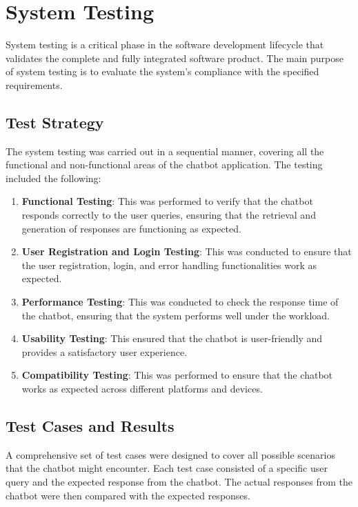 
\chapter{System Testing}

System testing is a critical phase in the software development lifecycle that validates the complete and fully integrated software product. The main purpose of system testing is to evaluate the system's compliance with the specified requirements.

\section{Test Strategy}

The system testing was carried out in a sequential manner, covering all the functional and non-functional areas of the chatbot application. The testing included the following:

\begin{enumerate}
\item \textbf{Functional Testing}: This was performed to verify that the chatbot responds correctly to the user queries, ensuring that the retrieval and generation of responses are functioning as expected.
\item \textbf{User Registration and Login Testing}: This was conducted to ensure that the user registration, login, and error handling functionalities work as expected.
\item \textbf{Performance Testing}: This was conducted to check the response time of the chatbot, ensuring that the system performs well under the workload.
\item \textbf{Usability Testing}: This ensured that the chatbot is user-friendly and provides a satisfactory user experience.
\item \textbf{Compatibility Testing}: This was performed to ensure that the chatbot works as expected across different platforms and devices.
\end{enumerate}

\section{Test Cases and Results}

A comprehensive set of test cases were designed to cover all possible scenarios that the chatbot might encounter. Each test case consisted of a specific user query and the expected response from the chatbot. The actual responses from the chatbot were then compared with the expected responses.

